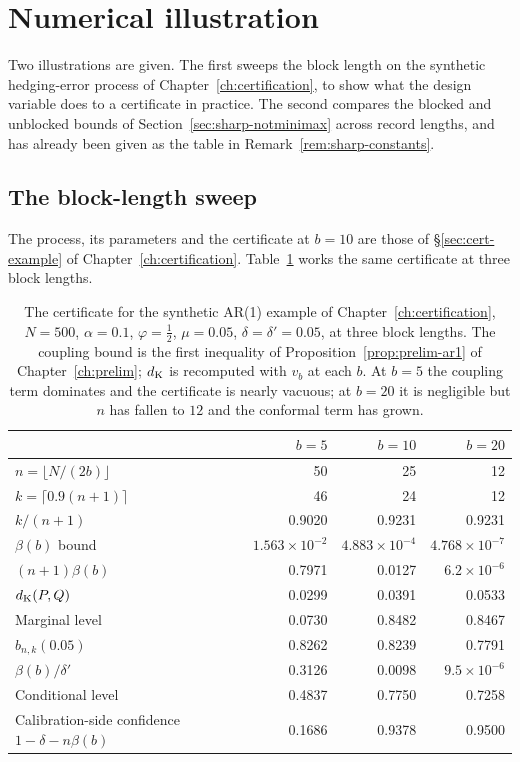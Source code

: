 \documentclass[../../../main.tex]{subfiles}
\begin{document}
\section{Numerical illustration}\label{sec:sharp-example}

Two illustrations are given. The first sweeps the block length on the synthetic hedging-error process of Chapter~\ref{ch:certification}, to show what the design variable does to a certificate in practice. The second compares the blocked and unblocked bounds of Section~\ref{sec:sharp-notminimax} across record lengths, and has already been given as the table in Remark~\ref{rem:sharp-constants}.

\subsection{The block-length sweep}

The process, its parameters and the certificate at $b=10$ are those of \S\ref{sec:cert-example} of Chapter~\ref{ch:certification}. Table~\ref{tab:example-sweep} works the same certificate at three block lengths.

\begin{table}[htbp]
\centering\small
\caption{The certificate for the synthetic AR(1) example of Chapter~\ref{ch:certification}, $N=500$, $\alpha=0.1$, $\varphi=\tfrac12$, $\mu=0.05$, $\delta=\delta'=0.05$, at three block lengths. The coupling bound is the first inequality of Proposition~\ref{prop:prelim-ar1} of Chapter~\ref{ch:prelim}; $d_{\mathrm{K}}$ is recomputed with $v_b$ at each $b$. At $b=5$ the coupling term dominates and the certificate is nearly vacuous; at $b=20$ it is negligible but $n$ has fallen to $12$ and the conformal term has grown.}\label{tab:example-sweep}
\begin{tabular}{@{}lrrr@{}}
\toprule
 & $b=5$ & $b=10$ & $b=20$ \\
\midrule
$n=\lfloor N/(2b)\rfloor$ & 50 & 25 & 12 \\
$k=\lceil0.9(n+1)\rceil$ & 46 & 24 & 12 \\
$k/(n+1)$ & 0.9020 & 0.9231 & 0.9231 \\
$\beta(b)$ bound & $1.563\times10^{-2}$ & $4.883\times10^{-4}$ & $4.768\times10^{-7}$ \\
$(n+1)\beta(b)$ & 0.7971 & 0.0127 & $6.2\times10^{-6}$ \\
$d_{\mathrm{K}}(P,Q)$ & 0.0299 & 0.0391 & 0.0533 \\
Marginal level & 0.0730 & 0.8482 & 0.8467 \\
$b_{n,k}(0.05)$ & 0.8262 & 0.8239 & 0.7791 \\
$\beta(b)/\delta'$ & 0.3126 & 0.0098 & $9.5\times10^{-6}$ \\
Conditional level & 0.4837 & 0.7750 & 0.7258 \\
Calibration-side confidence $1-\delta-n\beta(b)$ & 0.1686 & 0.9378 & 0.9500 \\
\bottomrule
\end{tabular}
\end{table}
\end{document}
